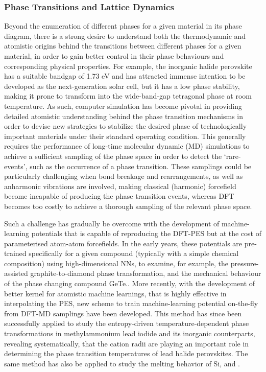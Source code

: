\subsubsection{Phase Transitions and Lattice Dynamics}   Beyond the enumeration of different phases for a given material in its phase diagram, there is a strong desire to understand both the thermodynamic and atomistic origins behind the transitions between different phases for a given material, in order to gain better control in their phase behaviours and corresponding physical properties. For example, the inorganic halide perovskite   has a suitable bandgap of 1.73 eV and has attracted immense intention to be developed as the next-generation solar cell, but it has a low phase stability, making it prone to transform into the wide-band-gap tetragonal phase at room temperature.\cite{swarnkar2016quantum} As such, computer simulation has become pivotal in providing detailed atomistic understanding behind the phase transition mechanisms in order to devise new strategies to stabilize the desired phase of technologically important materials under their standard operating condition. This generally requires the performance of long-time molecular dynamic (MD) simulations to achieve a sufficient sampling of the phase space in order to detect  the  `rare-events', such as the occurrence of a phase transition. These samplings could be particularly challenging when bond breakage and rearrangements, as well as anharmonic vibrations are involved,\cite{lahnsteiner2018finite,marronnier2017structural} making classical (harmonic) forcefield become incapable\cite{lahnsteiner2018finite} of producing the phase transition events, whereas DFT becomes too costly to achieve a thorough sampling of the relevant phase space. 

Such a challenge has gradually be overcome with the development of machine-learning potentials that is capable of reproducing the DFT-PES but at the cost of parameterised atom-atom forcefields. In the early years, these potentials are pre-trained specifically for a given compound (typically with a simple chemical composition) using high-dimensional NNs\cite{behler2011neural}, to examine, for example, the pressure-assisted  graphite-to-diamond phase transformation,\cite{khaliullin2011nucleation}  and the mechanical behaviour of the phase changing compound GeTe.\cite{sosso2013fast}.  More recently, with the development of better  kernel for atomistic machine learnings,\cite{bartok2013representing,de2016comparing} that is highly effective in interpolating the  PES,\cite{bartok2010gaussian} new scheme to train machine-learning potential on-the-fly from DFT-MD samplings have been developed. This method has since been successfully applied to study the entropy-driven temperature-dependent phase transformations in methylammonium lead iodide and its inorganic counterparts,\cite{jinnouchi2019phase} revealing systematically, that the cation radii are playing an important role in determining the phase transition temperatures of lead halide perovskites. The same method has also be applied to study the melting behavior of Si,\cite{jinnouchi2019fly} and .\cite{verdi2021thermal}

